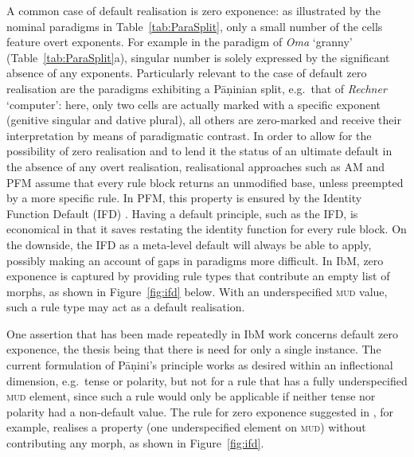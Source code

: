 \documentclass[output=paper,biblatex,babelshorthands,newtxmath,draftmode,colorlinks,citecolor=brown]{langscibook}
\begin{document}
\begin{exe}
\begin{xlist}
\begin{exe}
\begin{xlist}
\begin{exe}
\end{exe}

A common case of default realisation is zero exponence: as illustrated
by the  nominal paradigms in Table~\ref{tab:ParaSplit}, only a
small number of the cells feature overt exponents. For example in the paradigm
of \textit{Oma} `granny' (Table~\ref{tab:ParaSplit}a), singular number
is solely expressed by the significant absence of any
exponents. Particularly relevant to the case of default zero
realisation are the paradigms exhibiting a Pāṇinian split, e.g.\ that
of \textit{Rechner} `computer': here, only two cells are actually
marked with a specific exponent (genitive singular and dative plural),
all others are zero-marked and receive their interpretation by means
of paradigmatic contrast. In order to allow for the possibility of
zero realisation and to lend it the status of an ultimate default in
the absence of any overt realisation, realisational approaches such as
AM and PFM assume that every rule block returns an unmodified base,
unless preempted by a more specific rule. In PFM, this property is
ensured by the Identity Function Default (IFD)
\citep[][53]{Stump01}. Having a default principle, such as the IFD, is
economical in that it saves restating the identity function for every
rule block. On the downside, the IFD as a meta-level default 
will always be able to apply, possibly making an account of gaps in
paradigms more difficult. In IbM, zero exponence is captured by
providing rule types that contribute an empty list of morphs, as
shown in Figure~\ref{fig:ifd} below. With an underspecified \textsc{mud}
value, such a rule type may act as a default realisation.

One assertion that has been made repeatedly in IbM work concerns
default zero exponence, the thesis being that there is need for only a
single instance. The current formulation of Pāṇini's principle works
as desired within an inflectional dimension, e.g.\ tense or polarity,
but not for a rule that has a fully underspecified \textsc{mud}
element, since such a rule would only be applicable if neither tense
nor polarity had a non-default value.  The rule for zero exponence
suggested in \citet{Crysmann:Bonami:2016}, for example, realises a
property (one underspecified element on \textsc{mud}) without
contributing any morph, as shown in Figure~\ref{fig:ifd}.

\begin{figure} 


\end{figure}
\end{xlist}
\end{exe}
\end{xlist}
\end{exe}
\end{document}
